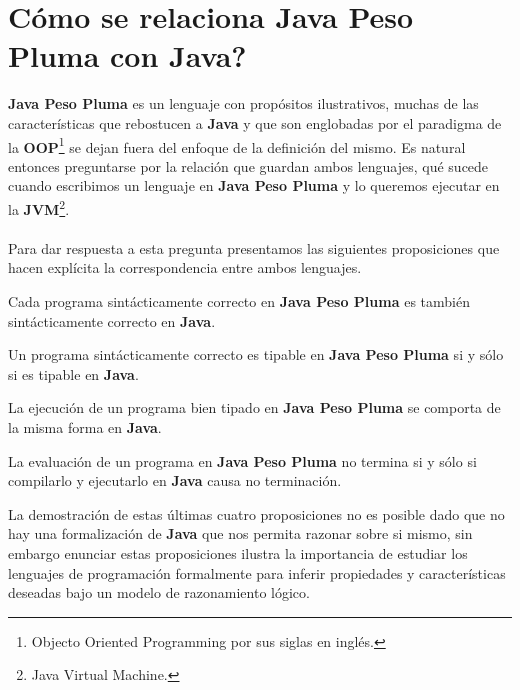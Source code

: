 \section{Cómo se relaciona Java Peso Pluma con Java?}

\textbf{Java Peso Pluma} es un lenguaje con propósitos ilustrativos, muchas de las características que rebostucen a \textbf{Java} y que son englobadas por el paradigma de la \textbf{OOP}\footnote{Objecto Oriented Programming por sus siglas en inglés.} se dejan fuera del enfoque de la definición del mismo. Es natural entonces preguntarse por la relación que guardan ambos lenguajes, qué sucede cuando escribimos un lenguaje en \textbf{Java Peso Pluma} y lo queremos ejecutar en la \textbf{JVM}\footnote{Java Virtual Machine.}. \\\\
Para dar respuesta a esta pregunta presentamos las siguientes proposiciones que hacen explícita la correspondencia entre ambos lenguajes.

\begin{definition}
    Cada programa sintácticamente correcto en \textbf{Java Peso Pluma} es también sintácticamente correcto en \textbf{Java}.
\end{definition}

\bigskip

\begin{definition} Un programa sintácticamente correcto es tipable en \textbf{Java Peso Pluma} si y sólo si es tipable en \textbf{Java}.
\end{definition}

\bigskip

\begin{definition}\label{3}La ejecución de un programa bien tipado en \textbf{Java Peso Pluma} se comporta de la misma forma en \textbf{Java}.
\end{definition}

\bigskip

\begin{definition} La evaluación de un programa en \textbf{Java Peso Pluma} no termina si y sólo si compilarlo y ejecutarlo en \textbf{Java} causa no terminación.
\end{definition}

\bigskip

La demostración de estas últimas cuatro proposiciones no es posible dado que no hay una formalización de \textbf{Java} que nos permita razonar sobre si mismo, sin embargo enunciar estas proposiciones ilustra la importancia de estudiar los lenguajes de programación formalmente para inferir propiedades y características deseadas bajo un modelo de razonamiento lógico.


